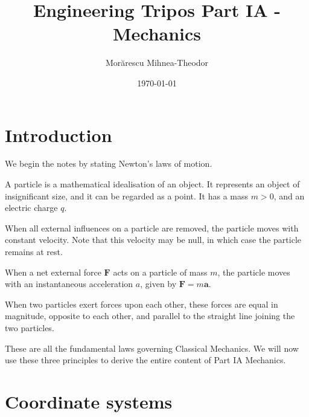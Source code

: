 \documentclass[12pt]{article}
\begin{document}
\title{Engineering Tripos Part IA - Mechanics}
\author{Morărescu Mihnea-Theodor}
\date{\today}

\maketitle

\newpage

\tableofcontents

\newpage

\section{Introduction}

We begin the notes by stating Newton's laws of motion.

\begin{definition}
    A particle is a mathematical idealisation of an object. It represents an object of insignificant size, and it can be regarded as a point. It has a mass $m > 0$, and an electric charge $q$.
\end{definition}

\begin{theorem}
    When all external influences on a particle are removed, the particle moves with constant velocity. Note that this velocity may be null, in which case the particle remains at rest.
\end{theorem}

\begin{theorem}
    When a net external force $\textbf{F}$ acts on a particle of mass $m$, the particle moves with an instantaneous acceleration $a$, given by $\textbf{F} = m\textbf{a}$.
\end{theorem}

\begin{theorem}
    When two particles exert forces upon each other, these forces are equal in magnitude, opposite to each other, and parallel to the straight line joining the two particles.
\end{theorem}

These are all the fundamental laws governing Classical Mechanics. We will now use these three principles to derive the entire content of Part IA Mechanics.

\newpage

\section{Coordinate systems}
\end{document}
